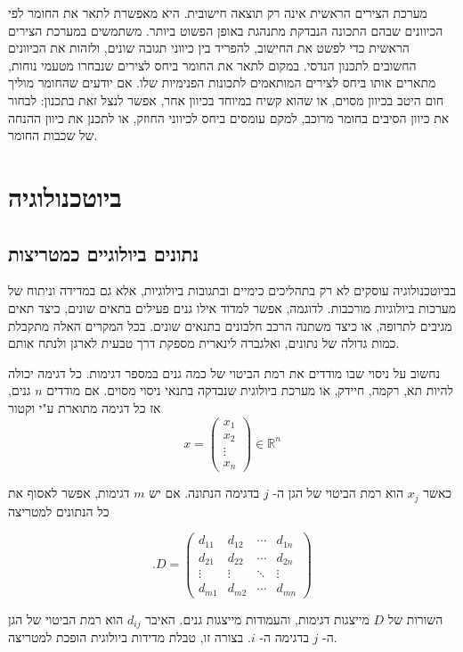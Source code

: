 \documentclass[12pt]{report}
\theoremstyle{plain}
\theoremstyle{definition}
\newcommand{\R}{\mathbb{R}}
\newcommand{\0}{\mathbf{0}}
\begin{document}
מערכת הצירים הראשית אינה רק תוצאה חישובית.
היא מאפשרת לתאר את החומר לפי הכיוונים שבהם התכונה הנבדקת מתנהגת באופן הפשוט ביותר.
משתמשים במערכת הצירים הראשית כדי לפשט את החישוב, להפריד בין כיווני תגובה שונים, ולזהות את הכיוונים החשובים לתכנון הנדסי. במקום לתאר את החומר ביחס לצירים שנבחרו מטעמי נוחות, מתארים אותו ביחס לצירים המותאמים לתכונות הפנימיות שלו. אם יודעים שהחומר מוליך חום היטב בכיוון מסוים, או שהוא קשיח במיוחד בכיוון אחר, אפשר לנצל זאת בתכנון: לבחור את כיוון הסיבים בחומר מרוכב, למקם עומסים ביחס לכיווני החוזק, או לתכנן את כיוון ההנחה של שכבות החומר.

\section{ביוטכנולוגיה}
\subsection*{נתונים ביולוגיים כמטריצות}

בביוטכנולוגיה עוסקים לא רק בתהליכים כימיים ובתגובות ביולוגיות, אלא גם במדידה וניתוח של מערכות ביולוגיות מורכבות. לדוגמה, אפשר למדוד אילו גנים פעילים בתאים שונים, כיצד תאים מגיבים לתרופה, או כיצד משתנה הרכב חלבונים בתנאים שונים. בכל המקרים האלה מתקבלת כמות גדולה של נתונים, ואלגברה לינארית מספקת דרך טבעית לארגן ולנתח אותם.

נחשוב על ניסוי שבו מודדים את רמת הביטוי של כמה גנים במספר דגימות.
כל דגימה יכולה להיות תא, רקמה, חיידק, או מערכת ביולוגית שנבדקה בתנאי ניסוי מסוים.
אם מודדים
$n$
גנים, אז כל דגימה מתוארת ע"י וקטור
$$
x =
\begin{pmatrix}
x_1 \\
x_2 \\
\vdots \\
x_n
\end{pmatrix}\in\R^n
$$

כאשר
$x_j$
הוא רמת הביטוי של הגן ה-
$j$
בדגימה הנתונה. אם יש
$m$
דגימות, אפשר לאסוף את כל הנתונים למטריצה

$$
.D =
\begin{pmatrix}
d_{11} & d_{12} & \cdots & d_{1n} \\
d_{21} & d_{22} & \cdots & d_{2n} \\
\vdots & \vdots & \ddots & \vdots \\
d_{m1} & d_{m2} & \cdots & d_{mn}
\end{pmatrix}
$$

השורות של
$D$
מייצגות דגימות, והעמודות מייצגות גנים.
האיבר
$d_{ij}$
הוא רמת הביטוי של הגן ה-
$j$
בדגימה ה-
$i$.
בצורה זו, טבלת מדידות ביולוגית הופכת למטריצה.
\end{document}
